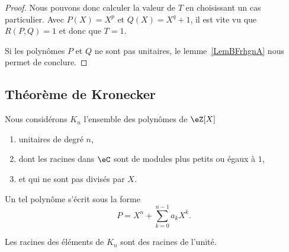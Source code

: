 \begin{proof}
	Nous pouvons donc calculer la valeur de \( T\) en choisissant un cas particulier. Avec \( P(X)=X^p\) et \( Q(X)=X^q+1\), il est vite vu que \( R(P,Q)=1\) et donc que \( T=1\).

	Si les polynômes \( P\) et \( Q\) ne sont pas unitaires, le lemme~\ref{LemBFrhgnA} nous permet de conclure.

\end{proof}


\subsection{Théorème de Kronecker}

Nous considérons \( K_n\) l'ensemble des polynômes de \( \eZ[X]\)
\begin{enumerate}
	\item
	      unitaires de degré \( n\),
	\item
	      dont les racines dans \( \eC\) sont de modules plus petits ou égaux à \( 1\),
	\item
	      et qui ne sont pas divisés par \( X\).
\end{enumerate}
Un tel polynôme s'écrit sous la forme
\begin{equation}
	P=X^n+\sum_{k=0}^{n-1}a_kX^k.
\end{equation}

\begin{theorem}    \label{ThoOWMNAVp}
	Les racines des éléments de \( K_n\) sont des racines de l'unité.
\end{theorem}

